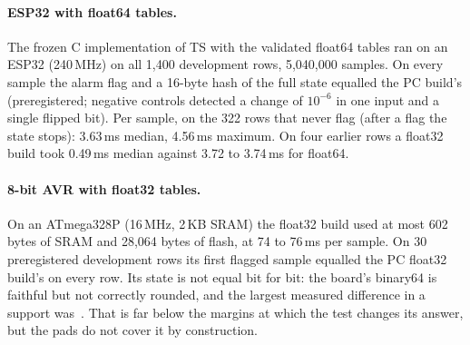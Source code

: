 \paragraph{ESP32 with float64 tables.} The frozen C implementation of TS with the validated float64 tables ran on an ESP32
(240\,MHz) on all 1,400 development rows, 5,040,000 samples. On every sample the alarm flag and a 16-byte hash of the
full state equalled the PC build's (preregistered; negative controls detected a change of $10^{-6}$ in one input and a
single flipped bit). Per sample, on the 322 rows that never flag (after a flag the state stops): 3.63\,ms median,
4.56\,ms maximum. On four earlier rows a float32 build took 0.49\,ms median against 3.72 to 3.74\,ms for float64.

\paragraph{8-bit AVR with float32 tables.} On an ATmega328P (16\,MHz, 2\,KB SRAM) the float32 build used at most 602
bytes of SRAM and 28,064 bytes of flash, at 74 to 76\,ms per sample. On 30 preregistered development rows its first
flagged sample equalled the PC float32 build's on every row. Its state is not equal bit for bit: the board's binary64
is faithful but not correctly rounded, and the largest measured difference in a support was \,\degC. That
is far below the margins at which the test changes its answer, but the pads do not cover it by construction.

